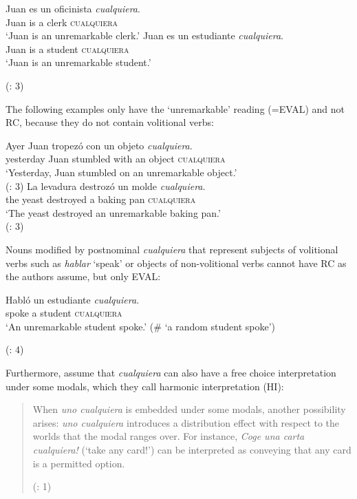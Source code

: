 \ea %
\ea  
\gll Juan es un oficinista \textit{cualquiera}.\\
Juan is a clerk \textsc{cualquiera}\\
\glt ‘Juan is an unremarkable clerk.’
\ex 
\gll Juan es un estudiante \textit{cualquiera}.\\
Juan is a student \textsc{cualquiera}\\
\glt ‘Juan is an unremarkable student.’

    (\citealt{am2018}: 3)
\z
\z

The following examples only have the ‘unremarkable’ reading (=EVAL) and not RC, because they do not contain volitional verbs:

\ea %
\ea \gll Ayer Juan tropezó con un objeto \textit{cualquiera}.\\
    yesterday Juan stumbled with an object \textsc{cualquiera}\\
    \glt ‘Yesterday, Juan stumbled on an unremarkable object.’\\
    (\citealt{am2018}: 3)
\ex \gll La levadura destrozó un molde \textit{cualquiera}.\\ 
    the yeast destroyed a {baking pan} \textsc{cualquiera}\\ 
    \glt ‘The yeast destroyed an unremarkable baking pan.’\\
    (\citealt{am2018}: 3)
\z
\z

Nouns modified by postnominal \textit{cualquiera} that represent subjects of volitional verbs such as \textit{hablar} ‘speak’ or objects of non-volitional verbs cannot have RC as the authors assume, but only EVAL:

\ea %
  \gll Habló un estudiante \textit{cualquiera}.\\
  spoke a student \textsc{cualquiera}\\
  \glt ‘An unremarkable student spoke.’ (\# ‘a random student spoke’)
  
  (\citealt{am2018}: 4)
\z

Furthermore, \citet{Alonso-OvalleMenéndez-Benito2011} assume that \textit{cualquiera} can also have a free choice interpretation under some modals, which they call harmonic interpretation (HI):


\begin{quote}
When \textit{uno cualquiera} is embedded under some modals, another possibility arises: \textit{uno cualquiera} introduces a distribution effect with respect to the worlds that the modal ranges over. For instance, \textit{Coge una carta cualquiera!} (‘take any card!’) can be interpreted as conveying that any card is a permitted option.

(\citealt{am2018}: 1)
\end{quote}

